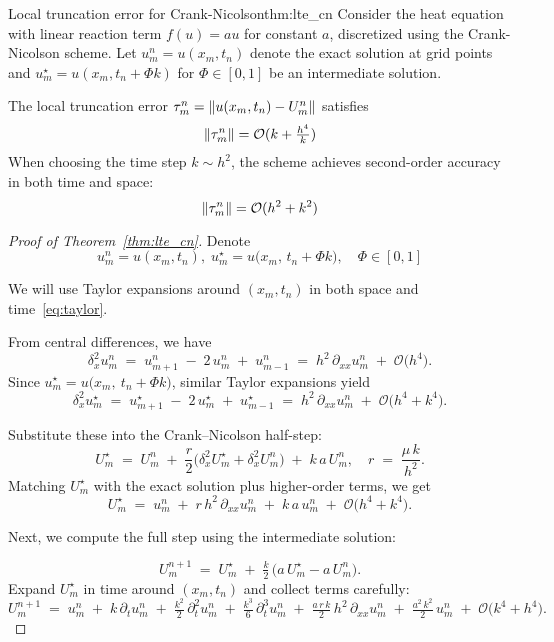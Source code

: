\begin{theorem}{Local truncation error for Crank-Nicolson}{thm:lte_cn}
  Consider the heat equation with linear reaction term \(f(u) = au\) for constant \(a\), discretized using the Crank-Nicolson scheme. Let \(u_m^n = u(x_m,t_n)\) denote the exact solution at grid points and \(u_m^\star = u(x_m, t_n + \Phi k)\) for \(\Phi \in [0,1]\) be an intermediate solution.

  The local truncation error \(\tau_m^n = \lVert u(x_m, t_n) - U_m^n\rVert\) satisfies
  \[
    \lVert\tau_m^n\rVert = \mathcal{O}(k + \tfrac{h^4}{k})
  \]
  When choosing the time step \(k \sim h^2\), the scheme achieves second-order accuracy in both time and space:
  \[
    \lVert\tau_m^n\rVert = \mathcal{O}(h^2 + k^2)
  \]
\end{theorem}
\begin{proof}[Proof of Theorem~\ref{thm:lte_cn}]

  Denote
  \[
    u_m^n = u(x_m, t_n),
    \;
    u_m^\star = u\bigl(x_m,\, t_n + \Phi k\bigr), \quad \Phi \in [0, 1] \tag{Exact and intermediate solutions}
  \]

  We will use Taylor expansions around $(x_m, t_n)$ in both space and time~\ref{eq:taylor}.

  From central differences, we have
  \[
    \delta_x^2 u_m^n
    \;=\; u_{m+1}^n \;-\; 2\,u_m^n \;+\; u_{m-1}^n
    \;=\; h^2\,\partial_{xx}u_m^n \;+\; \mathcal{O}\bigl(h^4\bigr).
  \]
  Since $u_m^\star = u\bigl(x_m,\ t_n+\Phi k\bigr)$, similar Taylor expansions yield
  \[
    \delta_x^2 u_m^\star
    \;=\; u_{m+1}^\star \;-\; 2\,u_m^\star \;+\; u_{m-1}^\star
    \;=\; h^2\,\partial_{xx}u_m^n \;+\; \mathcal{O}\bigl(h^4 + k^4\bigr).
  \]

  Substitute these into the Crank--Nicolson half-step:
  \[
    U_m^\star
    \;=\; U_m^n
    \;+\; \frac{r}{2}\bigl(\delta_x^2 U_m^\star + \delta_x^2 U_m^n\bigr)
    \;+\; k\,a\,U_m^n,
    \quad
    r \;=\; \frac{\mu\,k}{h^2}.
  \]
  Matching $U_m^\star$ with the exact solution plus higher-order terms, we get
  \[
    U_m^\star
    \;=\; u_m^n
    \;+\; r\,h^2\,\partial_{xx}u_m^n
    \;+\; k\,a\,u_m^n
    \;+\; \mathcal{O}\bigl(h^4 + k^4\bigr).
  \]

  Next, we compute the full step using the intermediate solution:

  \[
    U_m^{n+1}
    \;=\; U_m^\star
    \;+\; \tfrac{k}{2}\,\bigl(a\,U_m^\star - a\,U_m^n\bigr).
  \]
  Expand $U_m^\star$ in time around $(x_m,t_n)$ and collect terms carefully:
  \[
    U_m^{n+1}
    \;=\; u_m^n
    \;+\; k\,\partial_t u_m^n
    \;+\; \tfrac{k^2}{2}\,\partial_t^2 u_m^n
    \;+\; \tfrac{k^3}{6}\,\partial_t^3 u_m^n
    \;+\; \tfrac{a\,r\,k}{2}\,h^2\,\partial_{xx} u_m^n
    \;+\; \tfrac{a^2\,k^2}{2}\,u_m^n
    \;+\; \mathcal{O}\bigl(k^4 + h^4\bigr).
  \]


\end{proof}
